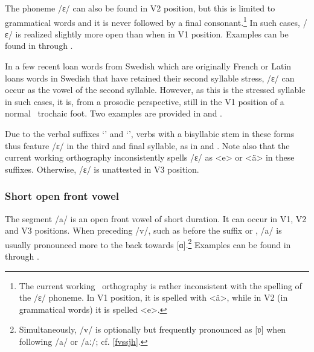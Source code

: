 The phoneme /ɛ/ can also be found in V2 position, but this is limited to grammatical words and it is never followed by a final consonant.\footnote{The current working \PS\ orthography is rather inconsistent with the spelling of the /ɛ/ phoneme. In V1 position, it is spelled with <ä>, while in V2 (in grammatical words) it is spelled <e>.} %
In such cases, /ɛ/ is realized slightly more open than when in V1 position. Examples can be found in  through .

In a few recent loan words from Swedish which are originally French or Latin loans words in Swedish that have retained their second syllable stress, /ɛ/ can occur as the vowel of the second syllable. However, as this is the stressed syllable in such cases, it is, from a prosodic perspective, still in the V1 position of a normal \PS\ trochaic foot. Two examples are provided in  and .

Due to the verbal suffixes  ‘’ and  ‘’, verbs with a bisyllabic stem in these forms thus feature /ɛ/ in the third and final syllable, as in  and . 
Note also that the current working orthography inconsistently spells /ɛ/ as <e> or <ä> in these suffixes. 
Otherwise, /ɛ/ is unattested in V3 position.



\subsubsection{Short open front vowel}
The segment /a/ is an open front vowel of short duration. It can occur in V1, V2 and V3 positions. When preceding /v/, such as before the suffix   or  , /a/ is usually pronounced more to the back towards [ɑ].\footnote{Simultaneously, /v/ is optionally but frequently pronounced as [ʋ] when following /a/ or /aː/; cf. \SEC\ref{fvssjh}.} 
Examples can be found in  through .

